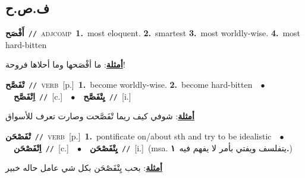 \documentclass[10pt,a4paper,twoside]{article} %
\begin{document}
\begin{multicols}{2}
\vspace{-3mm}
\subsection*{\color{blue}\foreignlanguage{arabic}{ف.ص.ح}\color{blue}{}} 

{\setlength\topsep{0pt}\textbf{\foreignlanguage{arabic}{أَفْصَح}}\ {\color{gray}\texttt{//}\color{black}}\ \textsc{adj\textunderscore comp}\ \textbf{1.}~most eloquent.  \textbf{2.}~smartest  \textbf{3.}~most worldly-wise.  \textbf{4.}~most hard-bitten\  \begin{flushright}\color{gray}\foreignlanguage{arabic}{\textbf{\underline{\foreignlanguage{arabic}{أمثلة}}}: ما أفْصَحها وما أحلاها فروحة!}\end{flushright}\color{black}} \vspace{2mm}

{\setlength\topsep{0pt}\textbf{\foreignlanguage{arabic}{تْفَصَّح}}\ {\color{gray}\texttt{//}\color{black}}\ \textsc{verb}\ [p.]\ \textbf{1.}~become worldly-wise.  \textbf{2.}~become hard-bitten\ \ $\bullet$\ \ \setlength\topsep{0pt}\textbf{\foreignlanguage{arabic}{اِتْفَصَّح}}\ {\color{gray}\texttt{//}\color{black}}\ [c.]\ \ $\bullet$\ \ \setlength\topsep{0pt}\textbf{\foreignlanguage{arabic}{يِتْفَصَّح}}\ {\color{gray}\texttt{//}\color{black}}\ [i.]\  \begin{flushright}\color{gray}\foreignlanguage{arabic}{\textbf{\underline{\foreignlanguage{arabic}{أمثلة}}}: شوفي كيف ريما تْفَصَّحت وصارت تعرف للأسواق}\end{flushright}\color{black}} \vspace{2mm}

{\setlength\topsep{0pt}\textbf{\foreignlanguage{arabic}{تْفَصْحَن}}\ {\color{gray}\texttt{//}\color{black}}\ \textsc{verb}\ [p.]\ \textbf{1.}~pontificate on/about sth and try to be idealistic\ \ $\bullet$\ \ \setlength\topsep{0pt}\textbf{\foreignlanguage{arabic}{اِتْفَصْحَن}}\ {\color{gray}\texttt{//}\color{black}}\ [c.]\ \ $\bullet$\ \ \setlength\topsep{0pt}\textbf{\foreignlanguage{arabic}{يِتْفَصْحَن}}\ {\color{gray}\texttt{//}\color{black}}\ [i.]\ \color{gray}(msa. \foreignlanguage{arabic}{يتفلسف ويفتي بأمر لا يفهم فيه}~\foreignlanguage{arabic}{\textbf{١.}})\color{black}\  \begin{flushright}\color{gray}\foreignlanguage{arabic}{\textbf{\underline{\foreignlanguage{arabic}{أمثلة}}}: بحب يِتْفَصْحَن بكل شي عامل حاله خبير}\end{flushright}\color{black}} \vspace{2mm}


\end{multicols}
\end{document}
